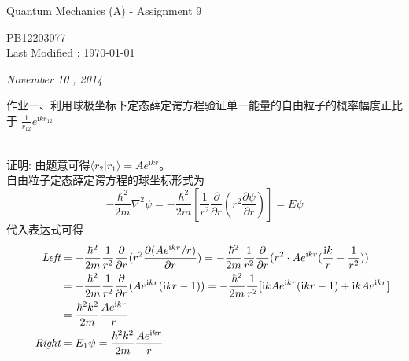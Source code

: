 \documentclass[a4paper]{article}
\newcommand{\dis}{\displaystyle}
\begin{document}
    \begin{center}
        \textsf{\LARGE{Quantum Mechanics (A) - Assignment 9}}\\[20pt]
    \end{center}
    \begin{CJK*}{UTF8}{kai}
        \begin{flushright}
            \small PB12203077\\
            \small Last Modified : \today\\[30pt]
        \end{flushright}
    \end{CJK*}
    \noindent\Large{\emph{November 10 , 2014}}\\[15pt]
    \begin{CJK*}{UTF8}{song}
    \begin{CJK*}{UTF8}{hei}
    \noindent 作业一、利用球极坐标下定态薛定谔方程验证单一能量的自由粒子的概率幅度正比于
    $\dis\frac{1}{r_{12}}e^{\mathrm{i}k r_{12}}$
    \end{CJK*}
    \\[12pt]
    {
    \noindent 证明:
    由题意可得$\dis\langle r_{2}|r_{1}\rangle = A e^{\mathrm{i} k r}$。\\
    自由粒子定态薛定谔方程的球坐标形式为
    $$-\frac{\hbar^{2}}{2 m}\nabla^{2}\psi
    = -\frac{\hbar^{2}}{2 m}[\frac{1}{r^{2}}\frac{\partial}{\partial r}(r^{2}\frac{\partial\psi}{\partial r})]=E\psi$$
    代入表达式可得
    \begin{equation*}\begin{split}
    \indent\emph{Left}
        & = -\frac{\hbar^{2}}{2 m}\frac{1}{r^{2}}\frac{\partial}{\partial r}(r^{2}\frac{\partial(A e^{\mathrm{i}k r}/r)}{\partial r})
         = -\frac{\hbar^{2}}{2 m}\frac{1}{r^{2}}\frac{\partial}{\partial r}(r^{2}
        \cdot A e^{\mathrm{i}k r}(\frac{\mathrm{i}k }{r}-\frac{1}{r^{2}}))\\
        & = -\frac{\hbar^{2}}{2 m}\frac{1}{r^{2}}\frac{\partial}{\partial r}
        (A e^{\mathrm{i}k r}(\mathrm{i}k r-1))
        = -\frac{\hbar^{2}}{2 m}\frac{1}{r^{2}}
        [\mathrm{i}k A e^{\mathrm{i}k r}(\mathrm{i}k r-1)+\mathrm{i}k A e^{\mathrm{i}k r}]\\
        & = \frac{\hbar^{2}k^{2}}{2 m}\frac{A e^{\mathrm{i}k r}}{r}\\
    \indent\emph{Right}
        & = E_{1}\psi = \frac{\hbar^{2}k^{2}}{2 m}\frac{A e^{\mathrm{i}k r}}{r}
    \end{split}\end{equation*}
}
\end{CJK*}
\end{document}
